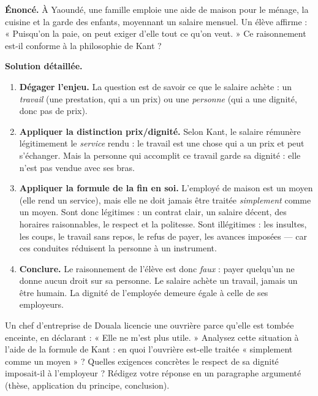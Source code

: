 \documentclass[11pt]{article}
\begin{document}
\begin{exoresolu}
\textbf{Énoncé.} À Yaoundé, une famille emploie une aide de maison pour le ménage, la cuisine et la garde des enfants, moyennant un salaire mensuel. Un élève affirme : « Puisqu'on la paie, on peut exiger d'elle tout ce qu'on veut. » Ce raisonnement est-il conforme à la philosophie de Kant ?\par
\tcblower
\textbf{Solution détaillée.}
\begin{enumerate}
\item \textbf{Dégager l'enjeu.} La question est de savoir ce que le salaire achète : un \emph{travail} (une prestation, qui a un prix) ou une \emph{personne} (qui a une dignité, donc pas de prix).
\item \textbf{Appliquer la distinction prix/dignité.} Selon Kant, le salaire rémunère légitimement le \emph{service} rendu : le travail est une chose qui a un prix et peut s'échanger. Mais la personne qui accomplit ce travail garde sa dignité : elle n'est pas vendue avec ses bras.
\item \textbf{Appliquer la formule de la fin en soi.} L'employé de maison est un moyen (elle rend un service), mais elle ne doit jamais être traitée \emph{simplement} comme un moyen. Sont donc légitimes : un contrat clair, un salaire décent, des horaires raisonnables, le respect et la politesse. Sont illégitimes : les insultes, les coups, le travail sans repos, le refus de payer, les avances imposées — car ces conduites réduisent la personne à un instrument.
\item \textbf{Conclure.} Le raisonnement de l'élève est donc \emph{faux} : payer quelqu'un ne donne aucun droit sur sa personne. Le salaire achète un travail, jamais un être humain. La dignité de l'employée demeure égale à celle de ses employeurs.
\end{enumerate}
\end{exoresolu}

\begin{exercice}
Un chef d'entreprise de Douala licencie une ouvrière parce qu'elle est tombée enceinte, en déclarant : « Elle ne m'est plus utile. » Analysez cette situation à l'aide de la formule de Kant : en quoi l'ouvrière est-elle traitée « simplement comme un moyen » ? Quelles exigences concrètes le respect de sa dignité imposait-il à l'employeur ? Rédigez votre réponse en un paragraphe argumenté (thèse, application du principe, conclusion).
\end{exercice}
\end{document}
